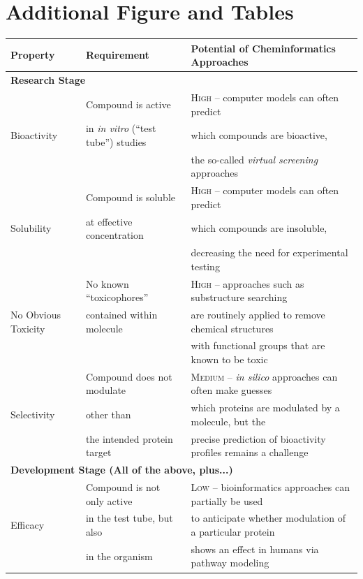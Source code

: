 \documentclass{sig-alternate}
\begin{document}
\section{Additional Figure and Tables}
%
\begin{table}
\begin{tabular}{|l|l|l|} \hline
\textbf{Property} & \textbf{Requirement} & \textbf{Potential of Cheminformatics Approaches} \\ \hline
\multicolumn{3}{|l|}{\textbf{Research Stage}} \\ \hline
\multirow{3}{*}{Bioactivity} & Compound is active & \textsc{High} -- computer models can often predict \\
& in \emph{in vitro} (``test tube'')
studies &  which compounds are bioactive, \\
&& the so-called \emph{virtual screening} approaches \\ \hline
\multirow{3}{*}{Solubility} & Compound is soluble  & \textsc{High} -- computer models can often predict \\
& at effective concentration & which compounds are insoluble, \\
&& decreasing the need for experimental testing \\ \hline
\multirow{3}{*}{No Obvious Toxicity} & No known ``toxicophores''  & \textsc{High} -- approaches such as substructure
searching \\
& contained within molecule & are routinely applied to remove
chemical structures \\
&& with functional groups that
are known to be toxic \\ \hline
\multirow{3}{*}{Selectivity} & Compound does not modulate  & \textsc{Medium} -- \emph{in silico} approaches can often make
guesses  \\
& other than  & which proteins are modulated by a
molecule, but the \\
& the intended protein
target & precise prediction of
bioactivity profiles remains a challenge \\ \hline
\multicolumn{3}{|l|}{\textbf{Development Stage (All of the above, plus...)}} \\ \hline
\multirow{3}{*}{Efficacy} & Compound is not only
active
& \textsc{Low} -- bioinformatics approaches can partially
be used  \\
 & in the test tube, but also & to anticipate whether modulation of a
particular protein  \\
in Animal/Human Models & in the
organism  & shows an effect in humans via pathway modeling\\ \hline

\end{tabular}
\end{table}
\end{document}
